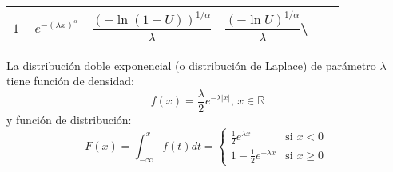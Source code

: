 \documentclass[
]{book}
\theoremstyle{break}
\theoremstyle{definition}
\theoremstyle{definition}
\theoremstyle{definition}
\theoremstyle{remark}
\let\BeginKnitrBlock\begin \let\EndKnitrBlock\end
\begin{document}
\begin{longtable}[]{@{}lllll@{}}
\begin{minipage}[t]{0.17\columnwidth}
\(1-e^{-\left( \lambda x\right) ^{\alpha}}\)\strut
\end{minipage} & \begin{minipage}[t]{0.17\columnwidth}\raggedright
\(\dfrac{\left( -\ln\left(1-U\right) \right) ^{1/\alpha}}\lambda\)\strut
\end{minipage} & \begin{minipage}[t]{0.17\columnwidth}\raggedright
\(\dfrac{\left( -\ln U\right)^{1/\alpha}}\lambda\)\textbackslash{}\strut
\end{minipage}\tabularnewline
\bottomrule
\end{longtable}

\BeginKnitrBlock{exercise}
\protect\hypertarget{exr:unnamed-chunk-2}{}{\label{exr:unnamed-chunk-2} }
\EndKnitrBlock{exercise}

La distribución doble exponencial (o distribución de Laplace) de
parámetro \(\lambda\) tiene función de densidad:
\[f\left( x\right)  =\frac{\lambda}{2}e^{-\lambda\left\vert x\right\vert
}\text{, }x\in\mathbb{R}\]
y función de distribución:
\[F\left( x\right)  =\int_{-\infty}^{x}f\left( t\right)  dt=\left\{
\begin{array}{ll}
\frac{1}{2}e^{\lambda x} & \text{si } x<0\\
1-\frac{1}{2}e^{-\lambda x} & \text{si } x\geq0
\end{array}
\ \right.\]
\end{document}
